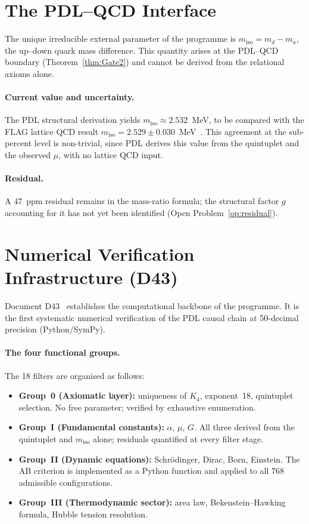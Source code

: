 \documentclass[11pt,a4paper]{article}
\theoremstyle{plain}
\theoremstyle{definition}
\theoremstyle{remark}
\begin{document}
\section{The PDL--QCD Interface}
\label{sec:QCD}
The unique irreducible external parameter of the programme is $m_{\mathrm{iso}}=m_d-m_u$, the up--down quark mass difference. This quantity arises at the PDL--QCD boundary (Theorem~\ref{thm:Gate2}) and cannot be derived from the relational axioms alone.

\paragraph{Current value and uncertainty.} The PDL structural derivation yields $m_{\mathrm{iso}}\approx 2.532$~MeV, to be compared with the FLAG lattice QCD result $m_{\mathrm{iso}}=2.529\pm0.030$~MeV~\cite{D30}. This agreement at the sub-percent level is non-trivial, since PDL derives this value from the quintuplet and the observed $\mu$, with no lattice QCD input.

\paragraph{Residual.} A $47$~ppm residual remains in the mass-ratio formula; the structural factor $g$ accounting for it has not yet been identified (Open Problem~\ref{op:residual}).

\section{Numerical Verification Infrastructure (D43)}
\label{sec:numerical}

Document D43~\cite{D43} establishes the computational backbone of the programme. It is the first systematic numerical verification of the PDL causal chain at 50-decimal precision (Python/SymPy).

\paragraph{The four functional groups.} The 18 filters are organised as follows:
\begin{itemize}
\item \textbf{Group~0 (Axiomatic layer):} uniqueness of $K_4$, exponent~18, quintuplet selection. No free parameter; verified by exhaustive enumeration.
\item \textbf{Group~I (Fundamental constants):} $\alpha$, $\mu$, $G$. All three derived from the quintuplet and $m_{\mathrm{iso}}$ alone; residuals quantified at every filter stage.
\item \textbf{Group~II (Dynamic equations):} Schr\"odinger, Dirac, Born, Einstein. The AB criterion is implemented as a Python function and applied to all 768 admissible configurations.
\item \textbf{Group~III (Thermodynamic sector):} area law, Bekenstein--Hawking formula, Hubble tension resolution.
\end{itemize}
\end{document}
